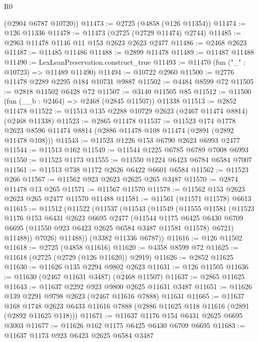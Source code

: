 \begin{lexlean}{R0}
\begin{coremodule}
      (@2904 @6787 @10720))
@11473 := @2725 (@4858 (@126 @11354))
@11474 := @126 @11336
@11478 := @11473 (@2725 (@2729 @11474) @2744)
@11485 := @2963 @11478 @1146 @11 @153 @2623 @2623 @2477
@11486 := @2468 @2623
@11487 := @11485 @11486
@11488 := @2899 @11478
@11489 := @11487 @11488
@11490 := LexLeanPreservation.construct_true
@11493 := @11470 (fun ("_" : @10723) => @11489 @11490)
@11494 := @10722 @2960
@11500 := @2776 @11478 @2289 @2295 @184 @10731 @9887
@11502 := @4484 @8599 @72
@11505 := @2818 @11502 @6428 @72
@11507 := @3140 @11505 @85
@11512 := @11500 (fun (__b : @2464) => @2468 (@2845 @11507)) @11338
@11513 := @2852 @11478
@11522 := @11513 @135 @2288 @10729 @2623 (@2467 @11474 @8814) (@2468 @11338)
@11523 := @2865 @11478
@11537 := @11523
    @174
    @1778
    @2623
    @8596
    @11474
    @8814
    (@2886 @11478 @108 @11474 (@2891 (@2892 @11478 @108)))
@11543 := @11523 @1226 @153 @6790 @2623 @6993 @2477
@11544 := @11513 @162
@11549 := @11544 @1225 @6785 @6789 @7008 @6993
@11550 := @11523 @1173
@11555 := @11550 @1224 @6423 @6784 @6584 @7007
@11561 := @11513 @738 @1172 @2626 @6422 @6601 @6584
@11562 := @11523 @266
@11567 := @11562 @923 @2623 @2625 @265 @3487
@11570 := @2874 @11478 @13 @265
@11571 := @11567 @11570
@11578 := @11562 @153 @2623 @2623 @265 @2477 @11570 @11488
@11581 := @11561 (@11571 @11578) @6613
@11615 := @11512
    (@11522
      (@11537
        (@11543
          (@11549
            (@11555
              @11581
              (@11523
                @1176
                @153
                @6431
                @2623
                @6695
                @2477
                (@11544
                  @1175
                  @6425
                  @6430
                  @6709
                  @6695
                  (@11550 @923 @6423 @2625 @6584 @3487 @11581 @11578)
                  @6721)
                @11488))
            @7026)
          @11488))
      (@3382 @11336 @6787))
@11616 := @126 @11502
@11618 := @2725 (@4858 @11616)
@11620 := @4358 @8599 @72
@11625 := @11618 (@2725 (@2729 (@126 @11620)) @2919)
@11626 := @2852 @11625
@11630 := @11626 @135 @2294 @9802 @2623
@11631 := @126 @11505
@11636 := @11630 (@2467 @11631 @3487) (@2468 @11507)
@11637 := @2865 @11625
@11643 := @11637 @2292 @923 @9800 @2625 @11631 @3487
@11651 := @11626 @139 @2291 @9798 @2623 (@2467 @11616 @7888) @11631
@11665 := @11637
    @168
    @1748
    @2623
    @6433
    @11616
    @7888
    (@2886 @11625 @118 @11616 (@2891 (@2892 @11625 @118)))
@11671 := @11637 @1176 @154 @6431 @2625 @6695 @3003
@11677 := @11626 @162 @1175 @6425 @6430 @6709 @6695
@11683 := @11637 @1173 @923 @6423 @2625 @6584 @3487

\end{coremodule}
\end{lexlean}
